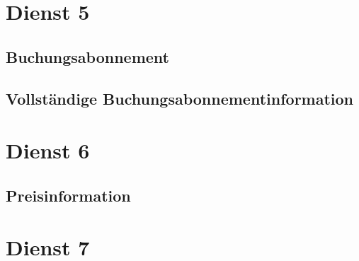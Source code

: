\section{Dienst 5}
\label{sec:Nachrichten:Dienst5}

\subsection*{Buchungsabonnement}
\label{subsec:Nachrichten:Dienst5:BookingAlertSubscription}





% 

% 



\subsection*{Vollständige Buchungsabonnementinformation}
\label{subsec:Nachrichten:Dienst5:CompleteBookingAlert}





\section{Dienst 6}
\label{sec:Nachrichten:Dienst6}

\subsection*{Preisinformation}
\label{subsec:Nachrichten:Dienst6:PriceInformation}





\section{Dienst 7}
\label{sec:Nachrichten:Dienst7}

